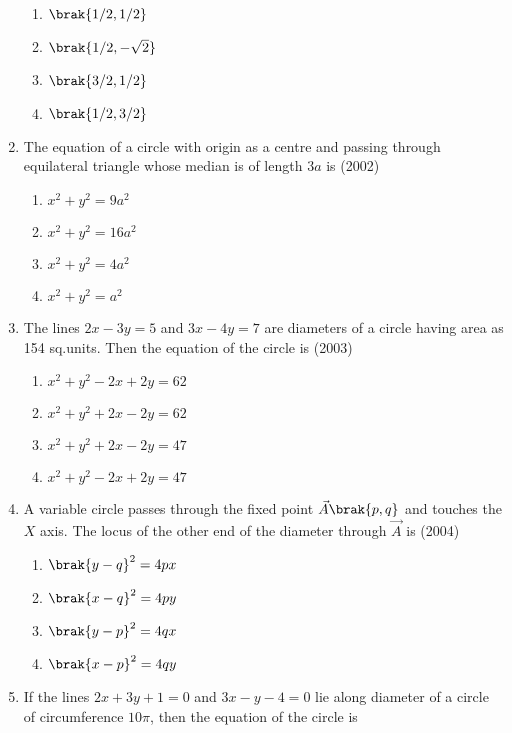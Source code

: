 \begin{enumerate}
\begin{multicols}{4}
\begin{enumerate}
\item$\brak{1/2, 1/2}$
\item$\brak{1/2, -\sqrt{2}}$
\item$\brak{3/2, 1/2}$
\item$\brak{1/2, 3/2}$
\end{enumerate}
\end{multicols}
\item The equation of a circle with origin as a centre and passing through equilateral triangle whose median is of length $3a$ is \hfill(2002)
\begin{multicols}{2}
\begin{enumerate}
\item$x^2+y^2=9a^2$
\item$x^2+y^2=16a^2$
\item$x^2+y^2=4a^2$
\item$x^2+y^2=a^2$
\end{enumerate}
\end{multicols}
\item The lines $2x-3y=5$ and $3x-4y=7$ are diameters of a circle having area as 154 sq.units. Then the equation of the circle is
\hfill{(2003)}
\begin{multicols}{2}
\begin{enumerate}
\item $x^2+y^2-2x+2y=62$
\item $x^2+y^2+2x-2y=62$
\item $x^2+y^2+2x-2y=47$
\item $x^2+y^2-2x+2y=47$
\end{enumerate}
\end{multicols}
\item A variable circle passes through the fixed point $\vec{A}\brak{p, q}$ and touches the $X$ axis. The locus of the other end of the diameter through $\vec{A}$ is
\hfill{(2004)}
\begin{multicols}{2}
\begin{enumerate}
\item $\brak{y-q}^2=4px$
\item $\brak{x-q}^2=4py$ 
\item $\brak{y-p}^2=4qx$
\item $\brak{x-p}^2=4qy$
\end{enumerate}
\end{multicols}
\item If the lines $2x+3y+1=0$ and $3x-y-4=0$ lie along diameter of a circle of circumference $10\pi$,  then the equation of the circle is 

\end{enumerate}
